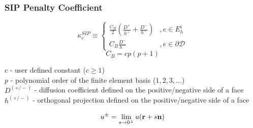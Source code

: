 \documentclass[compress,10pt]{beamer}
\begin{document}
\begin{frame}[t]\frametitle{SIP Penalty Coefficient}
\begin{block}{}{
	\begin{equation*}
		\kappa_e^{SIP} \equiv 
		\begin{cases}
		\frac{C_B}{2} \left(  \frac{D^+}{h^+} + \frac{D^-}{h^-}  \right) & , e \in E_h^i \\
		C_B \frac{D^-}{h^-}  & , e \in \partial \mathcal{D}
		\end{cases}
	\end{equation*}}
	\begin{equation*}
		C_B = c p (p+1)
	\end{equation*}
\end{block}
\begin{block}{}
$c$ - user defined constant ($c \geq 1$) \\
$p$ - polynomial order of the finite element basis ($1,2,3,...$) \\
$D^{(+/-)}$ - diffusion coefficient defined on the positive/negative side of a face\\
$h^{(+/-)}$ - orthogonal projection defined on the positive/negative side of a face
\end{block}
\begin{block}{}
	\begin{equation*}
		u^{\pm} = \lim_{s \rightarrow 0^{\pm}} u ({\bf r} + s {\bf n})
	\end{equation*}
\end{block}
\end{frame}
\end{document}
